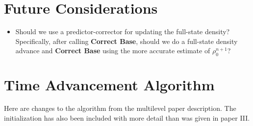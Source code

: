 
\section{Future Considerations}

\begin{itemize}

\item Should we use a predictor-corrector for updating the full-state density?
Specifically, after calling {\bf Correct Base}, should we do a full-state density 
advance and {\bf Correct Base} using the more accurate estimate of $\rho_0^{n+1}$?

\end{itemize}


\section{Time Advancement Algorithm}\label{Sec:Time Advancement Algorithm}
Here are changes to the algorithm from the multilevel paper description.
The initialization has also been included with more detail than was given in paper III.
